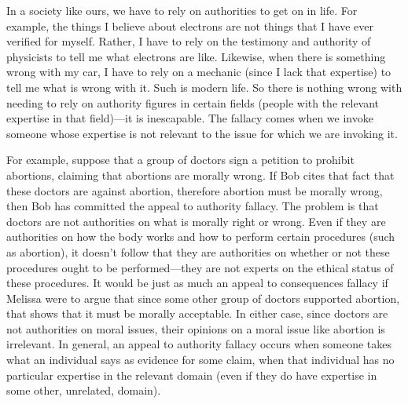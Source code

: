 In a society like ours, we have to rely on authorities to get on in life. For example, the things I believe about electrons are not things that I have ever verified for myself. Rather, I have to rely on the testimony and authority of physicists to tell me what electrons are like. Likewise, when there is something wrong with my car, I have to rely on a mechanic (since I lack that expertise) to tell me what is wrong with it. Such is modern life. So there is nothing wrong with needing to rely on authority figures in certain fields (people with the relevant expertise in that field)---it is inescapable. The fallacy comes when we invoke someone whose expertise is not relevant to the issue for which we are invoking it.

For example, suppose that a group of doctors sign a petition to prohibit abortions, claiming that abortions are morally wrong. If Bob cites that fact that these doctors are against abortion, therefore abortion must be morally wrong, then Bob has committed the appeal to authority fallacy. The problem is that doctors are not authorities on what is morally right or wrong. Even if they are authorities on how the body works and how to perform certain procedures (such as abortion), it doesn't follow that they are authorities on whether or not these procedures ought to be performed---they are not experts on the ethical status of these procedures. It would be just as much an appeal to consequences fallacy if Melissa were to argue that since some other group of doctors supported abortion, that shows that it must be morally acceptable. In either case, since doctors are not authorities on moral issues, their opinions on a moral issue like abortion is irrelevant. In general, an appeal to authority fallacy occurs when someone takes what an individual says as evidence for some claim, when that individual has no particular expertise in the relevant domain (even if they do have expertise in some other, unrelated, domain).
